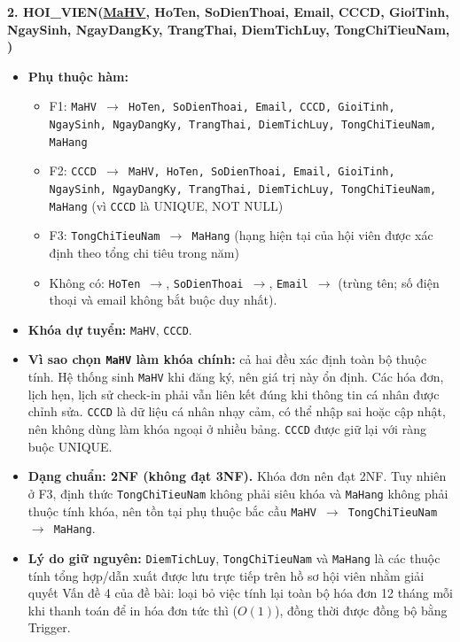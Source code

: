 \documentclass[11pt, a4paper]{article}
\newcommand{\pk}[1]{\bgroup\ULdepth=1.8pt\uline{#1}\egroup}
\newcommand{\fk}[1]{\bgroup\ULdepth=1.8pt\dashuline{#1}\egroup}
\begin{document}
\textbf{2. HOI\_VIEN(\pk{MaHV}, HoTen, SoDienThoai, Email, CCCD, GioiTinh, NgaySinh, NgayDangKy, TrangThai, DiemTichLuy, TongChiTieuNam, \fk{MaHang})}
\begin{itemize}
    \item \textbf{Phụ thuộc hàm:}
    \begin{itemize}
        \item F1: \texttt{MaHV $\rightarrow$ HoTen, SoDienThoai, Email, CCCD, GioiTinh, NgaySinh, NgayDangKy, TrangThai, DiemTichLuy, TongChiTieuNam, MaHang}
        \item F2: \texttt{CCCD $\rightarrow$ MaHV, HoTen, SoDienThoai, Email, GioiTinh, NgaySinh, NgayDangKy, TrangThai, DiemTichLuy, TongChiTieuNam, MaHang} (vì \texttt{CCCD} là UNIQUE, NOT NULL)
        \item F3: \texttt{TongChiTieuNam $\rightarrow$ MaHang} (hạng hiện tại của hội viên được xác định theo tổng chi tiêu trong năm)
        \item Không có: \texttt{HoTen $\rightarrow$}, \texttt{SoDienThoai $\rightarrow$}, \texttt{Email $\rightarrow$} (trùng tên; số điện thoại và email không bắt buộc duy nhất).
    \end{itemize}
    \item \textbf{Khóa dự tuyển:} \texttt{MaHV}, \texttt{CCCD}.
    \item \textbf{Vì sao chọn \texttt{MaHV} làm khóa chính:} cả hai đều xác định toàn bộ thuộc tính. Hệ thống sinh \texttt{MaHV} khi đăng ký, nên giá trị này ổn định. Các hóa đơn, lịch hẹn, lịch sử check-in phải vẫn liên kết đúng khi thông tin cá nhân được chỉnh sửa. \texttt{CCCD} là dữ liệu cá nhân nhạy cảm, có thể nhập sai hoặc cập nhật, nên không dùng làm khóa ngoại ở nhiều bảng. \texttt{CCCD} được giữ lại với ràng buộc UNIQUE.
    \item \textbf{Dạng chuẩn: 2NF (không đạt 3NF).} Khóa đơn nên đạt 2NF. Tuy nhiên ở F3, định thức \texttt{TongChiTieuNam} không phải siêu khóa và \texttt{MaHang} không phải thuộc tính khóa, nên tồn tại phụ thuộc bắc cầu \texttt{MaHV $\rightarrow$ TongChiTieuNam $\rightarrow$ MaHang}.
    \item \textbf{Lý do giữ nguyên:} \texttt{DiemTichLuy}, \texttt{TongChiTieuNam} và \texttt{MaHang} là các thuộc tính tổng hợp/dẫn xuất được lưu trực tiếp trên hồ sơ hội viên nhằm giải quyết Vấn đề 4 của đề bài: loại bỏ việc tính lại toàn bộ hóa đơn 12 tháng mỗi khi thanh toán để in hóa đơn tức thì ($O(1)$), đồng thời được đồng bộ bằng Trigger.
\end{itemize}
\end{document}
